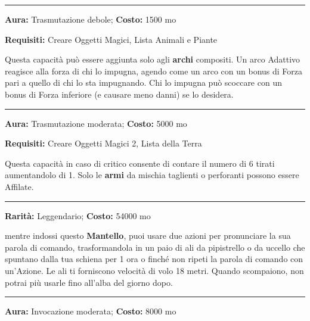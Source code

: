 \begin{multicols}{2}
\smallskip\noindent\rule{\linewidth}{2pt}  \hypertarget{Adattiva}{}\smallskip{}\noindent\label{Adattiva}

\textbf{Aura:} Trasmutazione debole; \textbf{Costo:} 1500 mo

\textbf{Requisiti:} Creare Oggetti Magici, Lista Animali e Piante

Questa capacità può essere aggiunta solo agli \textbf{archi} compositi. Un arco Adattivo reagisce alla forza di chi lo impugna, agendo come un arco con un bonus di Forza pari a quello di chi lo sta impugnando. Chi lo impugna può scoccare con un bonus di Forza inferiore (e causare meno danni) se lo desidera.

\smallskip\noindent\rule{\linewidth}{2pt}  \hypertarget{Affilata}{}\smallskip{}\noindent\label{Affilata}

\textbf{Aura:} Trasmutazione moderata; \textbf{Costo:} 5000 mo

\textbf{Requisiti:} Creare Oggetti Magici 2, Lista della Terra

Questa capacità in caso di critico consente di contare il numero di 6 tirati aumentandolo di 1. Solo le \textbf{armi} da mischia taglienti o perforanti possono essere Affilate.

\smallskip\noindent\rule{\linewidth}{2pt}  \hypertarget{AlidelVolo}{}\smallskip{}\noindent\label{AlidelVolo}

\textbf{Rarità:} Leggendario; \textbf{Costo:} 54000 mo

mentre indossi questo \textbf{Mantello}, puoi usare due azioni per pronunciare la sua parola di comando, trasformandola in un paio di ali da pipistrello o da uccello che spuntano dalla tua schiena per 1 ora o finché non ripeti la parola di comando con un'Azione. Le ali ti forniscono velocità di volo 18 metri. Quando scompaiono, non potrai più usarle fino all'alba del giorno dopo.

\smallskip\noindent\rule{\linewidth}{2pt}  \hypertarget{AmmazzaDraghi}{}\smallskip{}\noindent\label{AmmazzaDraghi}

\textbf{Aura:} Invocazione moderata; \textbf{Costo:} 8000 mo


\end{multicols}
